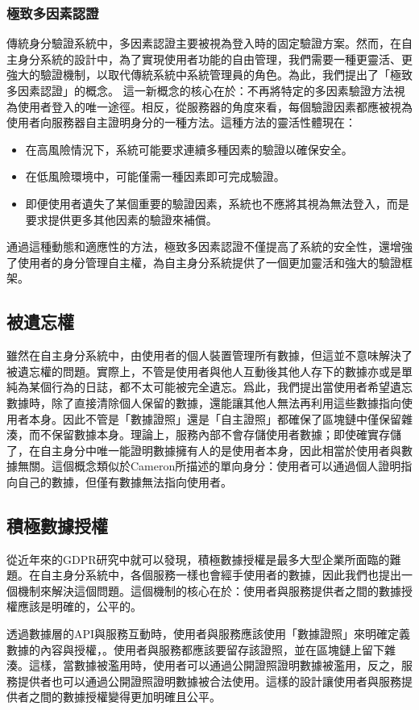 \subsubsection{極致多因素認證}
傳統身分驗證系統中，多因素認證主要被視為登入時的固定驗證方案。然而，在自主身分系統的設計中，為了實現使用者功能的自由管理，我們需要一種更靈活、更強大的驗證機制，以取代傳統系統中系統管理員的角色。為此，我們提出了「極致多因素認證」的概念。
這一新概念的核心在於：不再將特定的多因素驗證方法視為使用者登入的唯一途徑。相反，從服務器的角度來看，每個驗證因素都應被視為使用者向服務器自主證明身分的一種方法。這種方法的靈活性體現在：
\begin{itemize}
  \item 在高風險情況下，系統可能要求連續多種因素的驗證以確保安全。
  \item 在低風險環境中，可能僅需一種因素即可完成驗證。
  \item 即便使用者遺失了某個重要的驗證因素，系統也不應將其視為無法登入，而是要求提供更多其他因素的驗證來補償。
\end{itemize}
通過這種動態和適應性的方法，極致多因素認證不僅提高了系統的安全性，還增強了使用者的身分管理自主權，為自主身分系統提供了一個更加靈活和強大的驗證框架。
\subsection{被遺忘權}
雖然在自主身分系統中，由使用者的個人裝置管理所有數據，但這並不意味解決了被遺忘權的問題。實際上，不管是使用者與他人互動後其他人存下的數據亦或是單純為某個行為的日誌，都不太可能被完全遺忘。爲此，我們提出當使用者希望遺忘數據時，除了直接清除個人保留的數據，還能讓其他人無法再利用這些數據指向使用者本身。因此不管是「數據證照」還是「自主證照」都確保了區塊鏈中僅保留雜湊，而不保留數據本身。理論上，服務內部不會存儲使用者數據；即使確實存儲了，在自主身分中唯一能證明數據擁有人的是使用者本身，因此相當於使用者與數據無關。這個概念類似於Cameron\cite{cameron2005laws}所描述的單向身分：使用者可以通過個人證明指向自己的數據，但僅有數據無法指向使用者。
\subsection{積極數據授權}
從近年來的GDPR研究中就可以發現，積極數據授權是最多大型企業所面臨的難題。在自主身分系統中，各個服務一樣也會經手使用者的數據，因此我們也提出一個機制來解決這個問題。這個機制的核心在於：使用者與服務提供者之間的數據授權應該是明確的，公平的。

透過數據層的API與服務互動時，使用者與服務應該使用「數據證照」來明確定義數據的內容與授權，。使用者與服務都應該要留存該證照，並在區塊鏈上留下雜湊。這樣，當數據被濫用時，使用者可以通過公開證照證明數據被濫用，反之，服務提供者也可以通過公開證照證明數據被合法使用。這樣的設計讓使用者與服務提供者之間的數據授權變得更加明確且公平。
